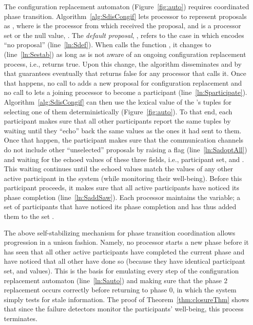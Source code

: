 \documentclass[11pt]{article}
\begin{document}
{
The configuration replacement automaton (Figure~\ref{fig:auto}) requires coordinated phase transition.
Algorithm~\ref{alg:SdisCongif} lets processor  to represent proposals as , where  is the processor from which  received the proposal,  and  is a processor set or the null value, . The \emph{default proposal}, , refers to the case in which  encodes ``no proposal'' (line~\ref{ln:Sdef}). 
When  calls the function , it changes  to  (line~\ref{ln:Sestab}) as long as  is not aware of an ongoing configuration replacement process, i.e.,  returns true. Upon this change, the algorithm disseminates  and by that guarantees eventually that  returns false for any processor that calls it. Once that happens, no call to  adds a new proposal for configuration replacement and no call to  lets a joining processor to become a participant (line~\ref{ln:Sparticipate}). Algorithm~\ref{alg:SdisCongif} can then use the lexical value of the 's tuples for selecting one of them deterministically (Figure~\ref{fig:auto}). To that end, each participant makes sure that all other participants report the same tuples by waiting until they ``echo'' back the same values as the ones it had sent to them. Once that happen, the participant  makes sure that the communication channels do not include other ``unselected'' proposals by raising a flag  (line~\ref{ln:SadoptAll}) and waiting for the echoed values of these three fields, i.e., participant set,  and . This waiting continues until the echoed values match the values of any other active participant in the system (while monitoring their well-being). Before this participant proceeds, it makes sure that all active participants have noticed its phase completion (line~\ref{ln:SaddSaw}). Each processor maintains the  variable; a set of participants that have noticed its phase completion and has thus added them to the set .

The above self-stabilizing mechanism for phase transition coordination allows progression in a unison fashion. Namely, no processor starts a new phase before it has seen that all other active participants have completed the current phase and have noticed that all other have done so (because they have identical participant set,  and  values). This is the basis for emulating every step of the configuration replacement automaton (line~\ref{ln:Sauto}) and making sure that the phase 2 replacement occurs correctly before returning to phase 0, in which the system simply tests for stale information. The proof of Theorem~\ref{thm:closureThm} shows that since the failure detectors monitor the participants' well-being, this process terminates.


\newpage
}
\end{document}
